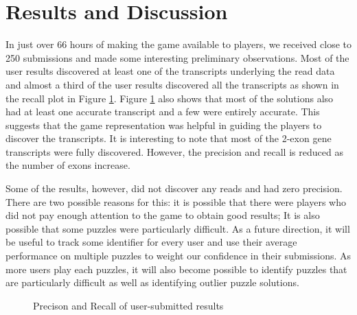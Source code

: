 \documentclass[12pt]{article}
\begin{document}
\section*{Results and Discussion}
In just over 66 hours of making the game available to players, we received close to 250 submissions and made some interesting preliminary observations. Most of the user results discovered at least one of the transcripts underlying the read data and almost a third of the user results discovered all the transcripts as shown in the recall plot in Figure \ref{fig:precisionandrecall}. Figure \ref{fig:precisionandrecall} also shows that most of the solutions also had at least one accurate transcript and a few were entirely accurate. This suggests that the game representation was helpful in guiding the players to discover the transcripts. It is interesting to note that most of the 2-exon gene transcripts were fully discovered. However, the precision and recall is reduced as the number of exons increase.

Some of the results, however, did not discover any reads and had zero precision. There are two possible reasons for this: it is possible that there were players who did not pay enough attention to the game to obtain good results; It is also possible that some puzzles were particularly difficult. As a future direction, it will be useful to track some identifier for every user and use their average performance on multiple puzzles to weight our confidence in their submissions. As more users play each puzzles, it will also become possible to identify puzzles that are particularly difficult as well as identifying outlier puzzle solutions.

\begin{figure}[H]
\centering
{} 
\caption{Precison and Recall of user-submitted results}\label{fig:precisionandrecall}
\end{figure}
\end{document}
